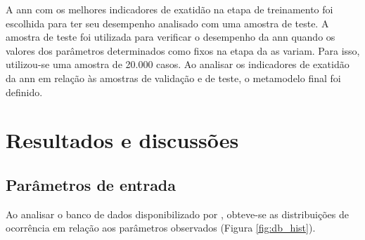 \documentclass[brazil,hardcopy,openany]{ufscthesis} %
\begin{document}
A \acrshort{ann} com os melhores indicadores de exatidão na etapa de treinamento foi escolhida para ter seu desempenho analisado com uma amostra de teste. 
A amostra de teste foi utilizada para verificar o desempenho da \acrshort{ann} quando os valores dos parâmetros determinados como fixos na etapa da \acrshort{as} variam. Para isso, utilizou-se uma amostra de 20.000 casos.
Ao analisar os indicadores de exatidão da \acrshort{ann} em relação às amostras de validação e de teste, o metamodelo final foi definido.

\chapter{Resultados e discussões}
\label{chapter:Resultados}

\section{Parâmetros de entrada} \label{section:parametrosdeentrada}
Ao analisar o banco de dados disponibilizado por , obteve-se as distribuições de ocorrência em relação aos parâmetros observados (Figura \ref{fig:db_hist}).
\end{document}
